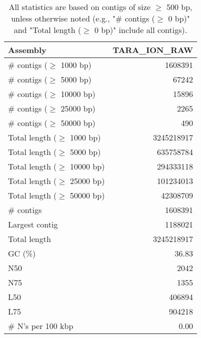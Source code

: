 \documentclass[12pt,a4paper]{article}
\begin{document}
\begin{table}[ht]
\begin{center}
\caption{All statistics are based on contigs of size $\geq$ 500 bp, unless otherwise noted (e.g., "\# contigs ($\geq$ 0 bp)" and "Total length ($\geq$ 0 bp)" include all contigs).}
\begin{tabular}{|l*{1}{|r}|}
\hline
Assembly & TARA\_ION\_RAW \\ \hline
\# contigs ($\geq$ 1000 bp) & 1608391 \\ \hline
\# contigs ($\geq$ 5000 bp) & 67242 \\ \hline
\# contigs ($\geq$ 10000 bp) & 15896 \\ \hline
\# contigs ($\geq$ 25000 bp) & 2265 \\ \hline
\# contigs ($\geq$ 50000 bp) & 490 \\ \hline
Total length ($\geq$ 1000 bp) & 3245218917 \\ \hline
Total length ($\geq$ 5000 bp) & 635758784 \\ \hline
Total length ($\geq$ 10000 bp) & 294333118 \\ \hline
Total length ($\geq$ 25000 bp) & 101234013 \\ \hline
Total length ($\geq$ 50000 bp) & 42308709 \\ \hline
\# contigs & 1608391 \\ \hline
Largest contig & 1188021 \\ \hline
Total length & 3245218917 \\ \hline
GC (\%) & 36.83 \\ \hline
N50 & 2042 \\ \hline
N75 & 1355 \\ \hline
L50 & 406894 \\ \hline
L75 & 904218 \\ \hline
\# N's per 100 kbp & 0.00 \\ \hline
\end{tabular}
\end{center}
\end{table}
\end{document}
